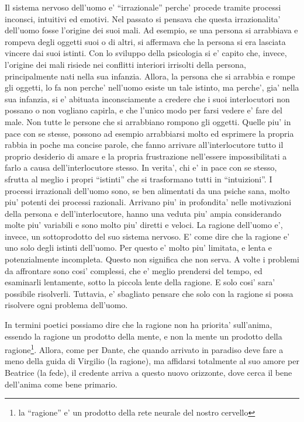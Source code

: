 Il sistema nervoso dell'uomo e' ``irrazionale'' perche' procede tramite processi inconsci, intuitivi ed emotivi. Nel passato si pensava che questa irrazionalita' dell'uomo fosse l'origine dei suoi mali. Ad esempio, se una persona si arrabbiava e rompeva degli oggetti suoi o di altri, si affermava che la persona si era lasciata vincere dai suoi istinti. Con lo sviluppo della psicologia si e' capito che, invece, l'origine dei mali risiede nei conflitti interiori irrisolti della persona, principalmente nati nella sua infanzia. Allora, la persona che si arrabbia e rompe gli oggetti, lo fa non perche' nell'uomo esiste un tale istinto, ma perche', gia' nella sua infanzia, si e' abituata inconsciamente a credere che i suoi interlocutori non possano o non vogliano capirla, e che l'unico modo per farsi vedere e' fare del male. Non tutte le persone che si arrabbiano rompono gli oggetti. Quelle piu' in pace con se stesse, possono ad esempio arrabbiarsi molto ed esprimere la propria rabbia in poche ma concise parole, che fanno arrivare all'interlocutore tutto il proprio desiderio di amare e la propria frustrazione nell'essere impossibilitati a farlo a causa dell'interlocutore stesso. In verita', chi e' in pace con se stesso, sfrutta al meglio i propri ``istinti'' che si trasformano tutti in ``intuizioni''. I processi irrazionali dell'uomo sono, se ben alimentati da una psiche sana, molto piu' potenti dei processi razionali. Arrivano piu' in profondita' nelle motivazioni della persona e dell'interlocutore, hanno una veduta piu' ampia considerando molte piu' variabili e sono molto piu' diretti e veloci. La ragione dell'uomo e', invece, un sottoprodotto del suo sistema nervoso. E' come dire che la ragione e' uno solo degli istinti dell'uomo. Per questo e' molto piu' limitata, e lenta e potenzialmente incompleta. Questo non significa che non serva. A volte i problemi da affrontare sono cosi' complessi, che e' meglio prendersi del tempo, ed esaminarli lentamente, sotto la piccola lente della ragione. E solo cosi' sara' possibile risolverli. Tuttavia, e' sbagliato pensare che solo con la ragione si possa risolvere ogni problema dell'uomo.

In termini poetici possiamo dire che la ragione non ha priorita' sull'anima, essendo la ragione un prodotto della mente, e non la mente un prodotto della ragione\footnote{la ``ragione'' e' un prodotto della rete neurale del nostro cervello}. Allora, come per Dante, che quando arrivato in paradiso deve fare a meno della guida di Virgilio (la ragione), ma affidarsi totalmente al suo amore per Beatrice (la fede), il credente arriva a questo nuovo orizzonte, dove cerca il bene dell'anima come bene primario. 

